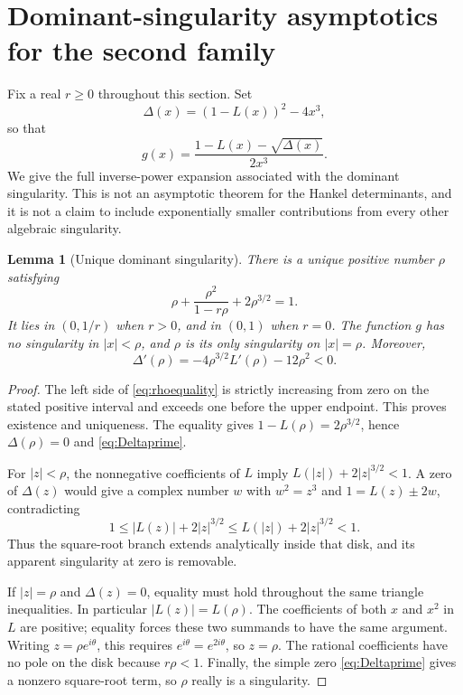 \documentclass[11pt,letterpaper]{article}
\numberwithin{equation}{section}
\newtheorem{lemma}[theorem]{Lemma}
\theoremstyle{definition}
\begin{document}
\section{Dominant-singularity asymptotics for the second family}
\label{sec:asymptotic}

Fix a real \(r\geq0\) throughout this section. Set
\begin{equation}
 \Delta(x)=(1-L(x))^2-4x^3,
 \label{eq:Delta}
\end{equation}
so that
\begin{equation}
 g(x)=\frac{1-L(x)-\sqrt{\Delta(x)}}{2x^3}.
 \label{eq:asymroot}
\end{equation}
We give the full inverse-power expansion associated with the dominant
singularity. This is not an asymptotic theorem for the Hankel determinants,
and it is not a claim to include exponentially smaller contributions from
every other algebraic singularity.

\begin{lemma}[Unique dominant singularity]
\label{lem:rho}
There is a unique positive number \(\rho\) satisfying
\begin{equation}
 \rho+\frac{\rho^2}{1-r\rho}+2\rho^{3/2}=1.
 \label{eq:rhoequality}
\end{equation}
It lies in \((0,1/r)\) when \(r>0\), and in \((0,1)\) when \(r=0\).
The function \(g\) has no singularity in \(|x|<\rho\), and \(\rho\) is
its only singularity on \(|x|=\rho\). Moreover,
\begin{equation}
 \Delta'(\rho)
 =-4\rho^{3/2}L'(\rho)-12\rho^2<0.
 \label{eq:Deltaprime}
\end{equation}
\end{lemma}
\begin{proof}
The left side of \eqref{eq:rhoequality} is strictly increasing from zero
on the stated positive interval and exceeds one before the upper endpoint.
This proves existence and uniqueness. The equality gives
\(1-L(\rho)=2\rho^{3/2}\), hence \(\Delta(\rho)=0\) and
\eqref{eq:Deltaprime}.

For \(|z|<\rho\), the nonnegative coefficients of \(L\) imply
\(L(|z|)+2|z|^{3/2}<1\). A zero of \(\Delta(z)\) would give a complex
number \(w\) with \(w^2=z^3\) and \(1=L(z)\pm2w\), contradicting
\[
 1\leq |L(z)|+2|z|^{3/2}\leq L(|z|)+2|z|^{3/2}<1.
\]
Thus the square-root branch extends analytically inside that disk, and its
apparent singularity at zero is removable.

If \(|z|=\rho\) and \(\Delta(z)=0\), equality must hold throughout the
same triangle inequalities. In particular \(|L(z)|=L(\rho)\). The
coefficients of both \(x\) and \(x^2\) in \(L\) are positive; equality
forces these two summands to have the same argument. Writing
\(z=\rho e^{i\theta}\), this requires
\(e^{i\theta}=e^{2i\theta}\), so \(z=\rho\).
The rational coefficients have no pole on the disk because \(r\rho<1\).
Finally, the simple zero \eqref{eq:Deltaprime} gives a nonzero square-root
term, so \(\rho\) really is a singularity.
\end{proof}
\end{document}
